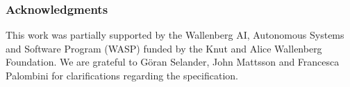 \documentclass[runningheads, envcountsame, a4paper, draft, x11names]{llncs}
\newcommand{\spacehack}{\vspace{-1em}}
\begin{document}
\spacehack
\subsubsection*{Acknowledgments} This work was partially supported by
the Wallenberg AI, Autonomous Systems and Software Program (WASP) funded by
the Knut and Alice Wallenberg Foundation.
%
We are grateful to G\"oran Selander, John Mattsson and Francesca Palombini for
clarifications regarding the specification.
%


\spacehack


\end{document}
